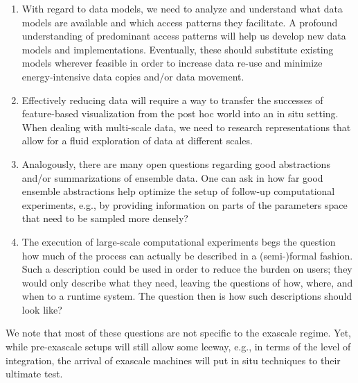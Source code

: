 \begin{refsection}
\begin{enumerate}
    \item With regard to data models, we need to analyze and understand what data models are available and which access patterns they facilitate. 
    A profound understanding of predominant access patterns will help us develop new data models and implementations. 
    Eventually, these should substitute existing models wherever feasible in order to increase data re-use and minimize energy-intensive data copies and/or data movement.
    \item Effectively reducing data will require a way to transfer the successes of feature-based visualization from the post hoc world into an in situ setting. When dealing with multi-scale data, we need to research representations that allow for a fluid exploration of data at different scales. 
    \item Analogously, there are many open questions regarding good abstractions and/or summarizations of ensemble data. 
    One can ask in how far good ensemble abstractions help optimize the setup of follow-up computational experiments, e.g., by providing information on parts of the parameters space that need to be sampled more densely?
    \item The execution of large-scale computational experiments begs the question how much of the process can actually be described in a (semi-)formal fashion. 
    Such a description could be used in order to reduce the burden on users; they would only describe what they need, leaving the questions of how, where, and when to a runtime system. 
    The question then is how such descriptions should look like?
\end{enumerate}

\noindent
We note that most of these questions are not specific to the exascale regime. 
Yet, while pre-exascale setups will still allow some leeway, e.g., in terms of the level of integration, the arrival of exascale machines will put in situ techniques to their ultimate test.



\end{refsection}

